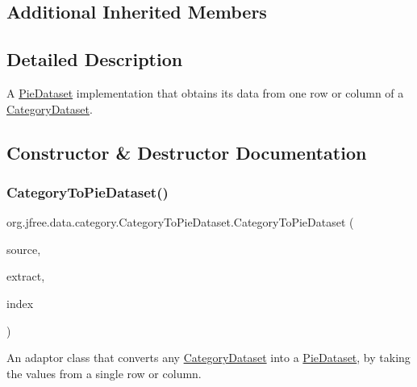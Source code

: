 \subsection*{Additional Inherited Members}


\subsection{Detailed Description}
A \mbox{\hyperlink{}{Pie\+Dataset}} implementation that obtains its data from one row or column of a \mbox{\hyperlink{interfaceorg_1_1jfree_1_1data_1_1category_1_1_category_dataset}{Category\+Dataset}}. 

\subsection{Constructor \& Destructor Documentation}
\mbox{\label{classorg_1_1jfree_1_1data_1_1category_1_1_category_to_pie_dataset_a19579fe08f99baab3999534e9a13022d}} 
\subsubsection{\texorpdfstring{Category\+To\+Pie\+Dataset()}{CategoryToPieDataset()}}
{\footnotesize\ttfamily org.\+jfree.\+data.\+category.\+Category\+To\+Pie\+Dataset.\+Category\+To\+Pie\+Dataset (\begin{DoxyParamCaption}\item[{\mbox{\hyperlink{interfaceorg_1_1jfree_1_1data_1_1category_1_1_category_dataset}{Category\+Dataset}}}]{source,  }\item[{Table\+Order}]{extract,  }\item[{int}]{index }\end{DoxyParamCaption})}

An adaptor class that converts any \mbox{\hyperlink{interfaceorg_1_1jfree_1_1data_1_1category_1_1_category_dataset}{Category\+Dataset}} into a \mbox{\hyperlink{}{Pie\+Dataset}}, by taking the values from a single row or column. 

